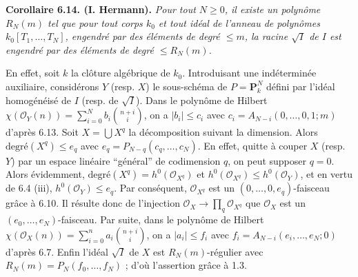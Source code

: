 \textbf{Corollaire 6.14. (I. Hermann).} \emph{Pour tout $N\ge0$, il existe un polyn\^ome $R_N(m)$ tel que pour tout corps $k_0$ et tout id\'eal de l'anneau de polyn\^omes $k_0[T_1,\ldots,T_N]$, engendr\'e par des \'el\'ements de degr\'e $\le m$, la racine $\sqrt I$ de $I$ est engendr\'e par des \'el\'ements de degr\'e $\le R_N(m)$.}

En effet, soit $k$ la cl\^oture alg\'ebrique de $k_0$. Introduisant une ind\'etermin\'ee auxiliaire, consid\'erons $Y$ (resp. $X$) le sous-sch\'ema de $P=\mathbf P^N_k$ d\'efini par l'id\'eal homog\'en\'eis\'e de $I$ (resp. de $\sqrt I$). Dans le polyn\^ome de Hilbert $\chi(\mathcal O_Y(n))=\sum_{i=0}^{N}b_i\binom{n+i}{i}$, on a $|b_i|\le c_i$ avec $c_i=A_{N-i}(0,\ldots,0,1;m)$ d'apr\`es 6.13. Soit $X=\bigcup X^q$ la d\'ecomposition suivant la dimension. Alors $\text{degr\'e}(X^q)\le e_q$ avec $e_q=P_{N-q}(c_q,\ldots,c_N)$. En effet, quitte \`a couper $X$ (resp. $Y$) par un espace lin\'eaire ``g\'en\'eral'' de codimension $q$, on peut supposer $q=0$. Alors \'evidemment, $\text{degr\'e}(X^q)=h^0(\mathcal O_{X^q})$ et $h^0(\mathcal O_{X^q})\le h^0(\mathcal O_Y)$, et en vertu de 6.4 (iii), $h^0(\mathcal O_Y)\le e_q$. Par cons\'equent, $\mathcal O_{X^q}$ est un $(0,\ldots,0,e_q)$-faisceau gr\^ace \`a 6.10. Il r\'esulte donc de l'injection $\mathcal O_X\to \prod_q\mathcal O_{X^q}$ que $\mathcal O_X$ est un $(e_0,\ldots,e_N)$-faisceau. Par suite, dans le polyn\^ome de Hilbert $\chi(\mathcal O_X(n))=\sum_{i=0}^{n}a_i\binom{n+i}{i}$, on a $|a_i|\le f_i$ avec $f_i=A_{N-i}(e_i,\ldots,e_N;0)$ d'apr\`es 6.7. Enfin l'id\'eal $\sqrt I$ de $X$ est $R_N(m)$-r\'egulier avec $R_N(m)=P_N(f_0,\ldots,f_N)$ ; d'o\`u l'assertion gr\^ace \`a 1.3.

